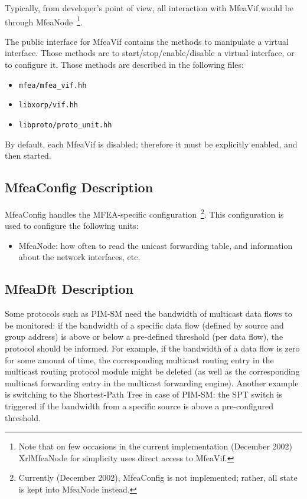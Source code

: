 \documentclass[11pt]{article}
\begin{document}
Typically, from developer's point of view, all interaction with MfeaVif
would be through MfeaNode~\footnote{Note that on few occasions in the current
implementation (December 2002) XrlMfeaNode for simplicity uses
direct access to MfeaVif.}.

The public interface for MfeaVif contains the methods to manipulate a
virtual interface. Those methods are to start/stop/enable/disable a
virtual interface, or to configure it. Those methods are described in
the following files:

\begin{itemize}
  \item \verb=mfea/mfea_vif.hh=
  \item \verb=libxorp/vif.hh=
  \item \verb=libproto/proto_unit.hh=
\end{itemize}

By default, each MfeaVif is disabled; therefore it must be explicitly
enabled, and then started.


\subsection{MfeaConfig Description}

MfeaConfig handles the MFEA-specific configuration~\footnote{Currently
(December 2002), MfeaConfig is not implemented; rather, all state is
kept into MfeaNode instead.}. This configuration is used to configure the
following units:

\begin{itemize}

  \item MfeaNode: how often to read the unicast forwarding table, and
  information about the network interfaces, etc.

\end{itemize}


\subsection{MfeaDft Description}

Some protocols such as PIM-SM need the bandwidth of multicast data flows
to be monitored: if the bandwidth of a specific data flow (defined by
source and group address) is above or below a pre-defined threshold (per
data flow), the protocol should be informed. For example, if the
bandwidth of a data flow is zero for some amount of time, the
corresponding multicast routing entry in the multicast routing protocol
module might be deleted (as well as the corresponding multicast
forwarding entry in the multicast forwarding engine). Another example is
switching to the Shortest-Path Tree in case of PIM-SM: the SPT switch is
triggered if the bandwidth from a specific source is above a
pre-configured threshold.
\end{document}

